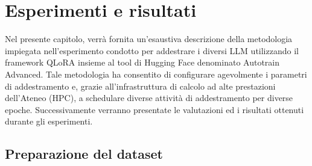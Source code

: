 \chapter{Esperimenti e risultati}\label{chapter:implementazione}
Nel presente capitolo, verrà fornita un'esaustiva descrizione della metodologia impiegata nell'esperimento condotto per addestrare i diversi LLM utilizzando il framework QLoRA insieme al tool di Hugging Face denominato Autotrain Advanced. Tale metodologia ha consentito di configurare agevolmente i parametri di addestramento e, grazie all'infrastruttura di calcolo ad alte prestazioni dell'Ateneo (HPC), a schedulare diverse attività di addestramento per diverse epoche. Successivamente verranno presentate le valutazioni ed i risultati ottenuti durante gli esperimenti.



\section{Preparazione del dataset}\label{sec:dataset}


